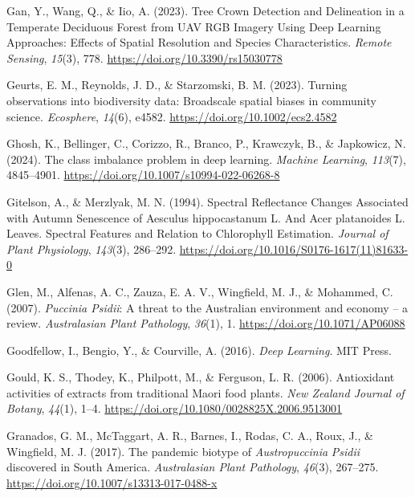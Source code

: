 \documentclass[
]{scrreprt}
\newlength{\cslhangindent}
\newenvironment{CSLReferences}[2] %
 {\begin{list}{}{%
  \setlength{\itemindent}{0pt}
  \setlength{\leftmargin}{0pt}
  \setlength{\parsep}{0pt}
  \setlength{\baselineskip}{12pt}
  \ifodd #1
   \setlength{\leftmargin}{\cslhangindent}
   \setlength{\itemindent}{-1\cslhangindent}
  \fi
  \setlength{\itemsep}{4pt}}}
 {\end{list}}
\begin{document}
\begin{CSLReferences}{1}{0}
Gan, Y., Wang, Q., \& Iio, A. (2023). Tree {Crown Detection} and
{Delineation} in a {Temperate Deciduous Forest} from {UAV RGB Imagery
Using Deep Learning Approaches}: {Effects} of {Spatial Resolution} and
{Species Characteristics}. \emph{Remote Sensing}, \emph{15}(3), 778.
\url{https://doi.org/10.3390/rs15030778}

Geurts, E. M., Reynolds, J. D., \& Starzomski, B. M. (2023). Turning
observations into biodiversity data: {Broadscale} spatial biases in
community science. \emph{Ecosphere}, \emph{14}(6), e4582.
\url{https://doi.org/10.1002/ecs2.4582}

Ghosh, K., Bellinger, C., Corizzo, R., Branco, P., Krawczyk, B., \&
Japkowicz, N. (2024). The class imbalance problem in deep learning.
\emph{Machine Learning}, \emph{113}(7), 4845--4901.
\url{https://doi.org/10.1007/s10994-022-06268-8}

Gitelson, A., \& Merzlyak, M. N. (1994). Spectral {Reflectance Changes
Associated} with {Autumn Senescence} of {Aesculus} hippocastanum {L}.
And {Acer} platanoides {L}. {Leaves}. {Spectral Features} and {Relation}
to {Chlorophyll Estimation}. \emph{Journal of Plant Physiology},
\emph{143}(3), 286--292.
\url{https://doi.org/10.1016/S0176-1617(11)81633-0}

Glen, M., Alfenas, A. C., Zauza, E. A. V., Wingfield, M. J., \&
Mohammed, C. (2007). {\emph{Puccinia Psidii}}: A threat to the
{Australian} environment and economy -- a review. \emph{Australasian
Plant Pathology}, \emph{36}(1), 1. \url{https://doi.org/10.1071/AP06088}

Goodfellow, I., Bengio, Y., \& Courville, A. (2016). \emph{Deep
{Learning}}. MIT Press.

Gould, K. S., Thodey, K., Philpott, M., \& Ferguson, L. R. (2006).
Antioxidant activities of extracts from traditional {Maori} food plants.
\emph{New Zealand Journal of Botany}, \emph{44}(1), 1--4.
\url{https://doi.org/10.1080/0028825X.2006.9513001}

Granados, G. M., McTaggart, A. R., Barnes, I., Rodas, C. A., Roux, J.,
\& Wingfield, M. J. (2017). The pandemic biotype of
{\emph{Austropuccinia}}{ \emph{Psidii}} discovered in {South America}.
\emph{Australasian Plant Pathology}, \emph{46}(3), 267--275.
\url{https://doi.org/10.1007/s13313-017-0488-x}


\end{CSLReferences}
\end{document}
